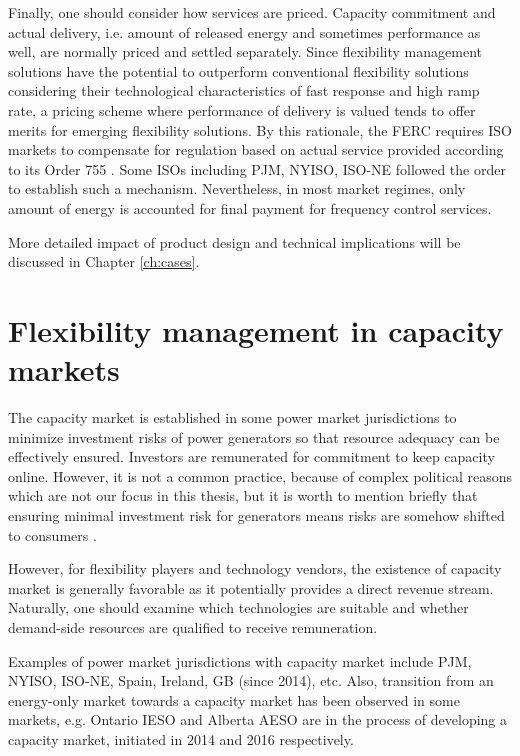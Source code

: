 Finally, one should consider how services are priced. Capacity commitment and actual delivery, i.e. amount of released energy and sometimes performance as well, are normally priced and settled separately. Since flexibility management solutions have the potential to outperform conventional flexibility solutions considering their technological characteristics of fast response and high ramp rate, a pricing scheme where performance of delivery is valued tends to offer merits for emerging flexibility solutions. By this rationale, the FERC requires ISO markets to compensate for regulation based on actual service provided
according to its Order 755 \cite{FERC755}. Some ISOs including PJM, NYISO, ISO-NE followed the order to establish such a mechanism. Nevertheless, in most market regimes, only amount of energy is accounted for final payment for frequency control services.

More detailed impact of product design and  technical implications will be discussed in Chapter \ref{ch:cases}.

\section{Flexibility management in capacity markets}
\label{sec:CM}

The capacity market is established in some power market jurisdictions to minimize investment risks of power generators so that resource adequacy can be effectively ensured. Investors are remunerated for commitment to keep capacity online. However, it is not a common practice, because of complex political reasons which are not our focus in this thesis, but it is worth to mention briefly that ensuring minimal investment risk for generators means risks are somehow shifted to consumers \cite{Cochran2013}. 

However, for flexibility players and technology vendors, the existence of capacity market is generally favorable as it potentially provides a direct revenue stream. Naturally, one should examine which technologies are suitable and whether demand-side resources are qualified to receive remuneration.

Examples of power market jurisdictions with capacity market include PJM, NYISO, ISO-NE, Spain, Ireland, GB (since 2014), etc. Also, transition from an energy-only market towards a capacity market has been observed in some markets, e.g. Ontario IESO and Alberta AESO are in the process of developing a capacity market, initiated in 2014 and 2016 respectively. 

